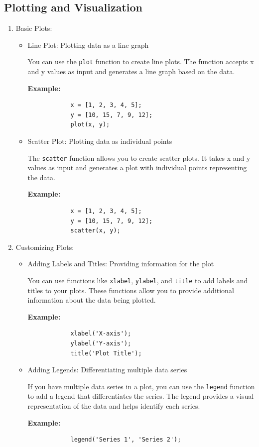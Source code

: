 \documentclass[
11pt, %
a4paper, %
oneside, %
headinclude,footinclude, %
BCOR5mm, %
]{scrartcl}
\begin{document}
\subsection{Plotting and Visualization}
\begin{enumerate}
	\item Basic Plots:
	\begin{itemize}
		\item Line Plot: Plotting data as a line graph
		
		You can use the \texttt{plot} function to create line plots. The function accepts x and y values as input and generates a line graph based on the data.
		
		\textbf{Example:}
		\begin{verbatim}
			x = [1, 2, 3, 4, 5];
			y = [10, 15, 7, 9, 12];
			plot(x, y);
		\end{verbatim}
		
		\item Scatter Plot: Plotting data as individual points
		
		The \texttt{scatter} function allows you to create scatter plots. It takes x and y values as input and generates a plot with individual points representing the data.
		
		\textbf{Example:}
		\begin{verbatim}
			x = [1, 2, 3, 4, 5];
			y = [10, 15, 7, 9, 12];
			scatter(x, y);
		\end{verbatim}
	\end{itemize}
	
	\item Customizing Plots:
	\begin{itemize}
		\item Adding Labels and Titles: Providing information for the plot
		
		You can use functions like \texttt{xlabel}, \texttt{ylabel}, and \texttt{title} to add labels and titles to your plots. These functions allow you to provide additional information about the data being plotted.
		
		\textbf{Example:}
		\begin{verbatim}
			xlabel('X-axis');
			ylabel('Y-axis');
			title('Plot Title');
		\end{verbatim}
		
		\item Adding Legends: Differentiating multiple data series
		
		If you have multiple data series in a plot, you can use the \texttt{legend} function to add a legend that differentiates the series. The legend provides a visual representation of the data and helps identify each series.
		
		\textbf{Example:}
		\begin{verbatim}
			legend('Series 1', 'Series 2');
		\end{verbatim}
	\end{itemize}
\end{enumerate}
\end{document}
